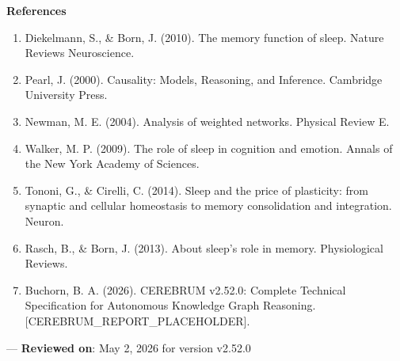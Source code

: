 \textbf{References}
\begin{enumerate}
\item Diekelmann, S., \& Born, J. (2010). The memory function of sleep. Nature Reviews Neuros\-cience.
\item Pearl, J. (2000). Causality: Models, Reasoning, and Inference. Cambridge University Press.
\item Newman, M. E. (2004). Analysis of weighted networks. Physical Review E.
\item Walker, M. P. (2009). The role of sleep in cognition and emotion. Annals of the New York Academy of Sciences.
\item Tononi, G., \& Cirelli, C. (2014). Sleep and the price of plasticity: from synaptic and cellular homeostasis to memory conso\-lidation and integration. Neuron.
\item Rasch, B., \& Born, J. (2013). About sleep's role in memory. Physio\-logical Reviews.
\item Buchorn, B. A. (2026). CEREBRUM v2.52.0: Complete Technical Specif\-ication for Autonomous Knowledge Graph Reasoning. [CEREBRUM\_REPORT\_PLACEHOLDER].

\end{enumerate}
---
\textbf{Reviewed on}: May 2, 2026 for version v2.52.0

